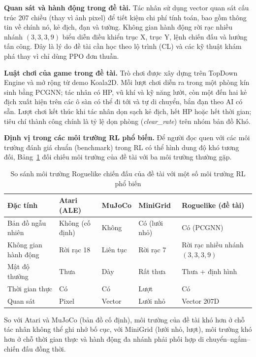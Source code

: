 \textbf{Quan sát và hành động trong đề tài.} Tác nhân sử dụng vector quan sát cấu trúc 207 chiều (thay vì ảnh pixel) để tiết kiệm chi phí tính toán, bao gồm thông tin về chính nó, kẻ địch, đạn và tường. Không gian hành động rời rạc nhiều nhánh $(3,3,3,9)$ biểu diễn điều khiển trục X, trục Y, lệnh chiến đấu và hướng tấn công. Đây là lý do đề tài cần học theo lộ trình (CL) và các kỹ thuật khám phá thay vì chỉ dùng PPO đơn thuần.

\textbf{Luật chơi của game trong đề tài.} Trò chơi được xây dựng trên TopDown Engine và mở rộng từ demo Koala2D. Mỗi lượt chơi diễn ra trong một phòng kín sinh bằng PCGNN; tác nhân có HP, vũ khí và kỹ năng lướt, còn một đến hai kẻ địch xuất hiện trên các ô sàn có thể đi tới và tự di chuyển, bắn đạn theo AI có sẵn. Lượt chơi kết thúc khi tác nhân dọn sạch kẻ địch, hết HP hoặc hết thời gian; tiêu chí thành công chính là tỷ lệ dọn phòng (\emph{clear\_rate}) trên nhóm bản đồ Khó.

\textbf{Định vị trong các môi trường RL phổ biến.} Để người đọc quen với các môi trường đánh giá chuẩn (benchmark) trong RL có thể hình dung độ khó tương đối, Bảng~\ref{tab:rl_env_comparison} đối chiếu môi trường của đề tài với ba môi trường thường gặp.

\begin{table}[H]
    \centering
    \small
    \caption{So sánh môi trường Roguelike chiến đấu của đề tài với một số môi trường RL phổ biến}
    \label{tab:rl_env_comparison}
    \begin{tabular}{|p{3.2cm}|p{2.6cm}|p{2.6cm}|p{2.4cm}|p{2.8cm}|}
        \hline
        \textbf{Đặc tính} & \textbf{Atari (ALE)} & \textbf{MuJoCo} & \textbf{MiniGrid} & \textbf{Roguelike (đề tài)} \\
        \hline
        Bản đồ ngẫu nhiên & Không (cố định) & Không & Có (lưới nhỏ) & Có (PCGNN) \\
        \hline
        Không gian hành động & Rời rạc 18 & Liên tục & Rời rạc 7 & Rời rạc nhiều nhánh $(3,3,3,9)$ \\
        \hline
        Mật độ thưởng & Thưa & Dày & Rất thưa & Thưa + định hình \\
        \hline
        Thời gian thực & Có & Có & Lượt & Có \\
        \hline
        Quan sát & Pixel & Vector & Lưới nhỏ & Vector 207D \\
        \hline
    \end{tabular}
\end{table}

So với Atari và MuJoCo (bản đồ cố định), môi trường của đề tài khó hơn ở chỗ tác nhân không thể ghi nhớ bố cục, với MiniGrid (lưới nhỏ, lượt), môi trường khó hơn ở chỗ thời gian thực và hành động đa nhánh phải phối hợp di chuyển--ngắm--chiến đấu đồng thời.

